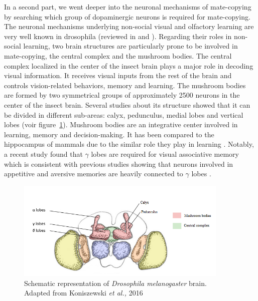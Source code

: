 \documentclass[a4paper, 12pt]{article}
\begin{document}
In a second part, we went deeper into the neuronal mechanisms of mate-copying by searching which group of dopaminergic neurons is required for mate-copying. The neuronal mechanisms underlying non-social visual and olfactory learning are very well known in drosophila (reviewed in \textcite{guo_vision_2017} and \textcite{cognigni_right_2018}). Regarding their roles in non-social learning, two brain structures are particularly prone to be involved in mate-copying, the central complex and the mushroom bodies. The central complex localized in the center of the insect brain plays a major role in decoding visual information. It receives visual inputs from the rest of the brain and controls vision-related behaviors, memory and learning. The mushroom bodies are formed by two symmetrical groups of approximately 2500 neurons in the center of the insect brain. Several studies about its structure showed that it can be divided in different sub-areas: calyx, pedunculus, medial lobes and vertical lobes \parencite{aso_neuronal_2014}(voir figure~\ref{fig:brain}). Mushroom bodies are an integrative center involved in learning, memory and decision-making. It has been compared to the hippocampus of mammals due to the similar role they play in learning \parencite{strausfeld_evolution_1998}.
Notably, a recent study found that \(\gamma\) lobes are required for visual associative memory \parencite{ vogt_shared_2014} which is consistent with previous studies showing that neurons involved in appetitive and aversive memories are heavily connected to \(\gamma\) lobes \parencite{claridge_writing_2009, burke_layered_2012}. 

	\begin{figure}
	\centering
	\includegraphics[width=0.9\textwidth]{images/brain}
	\caption{Schematic representation of \textit{Drosophila melanogaster} brain.\\
		Adapted from Koniszewski \textit{et al.,} 2016
		}
	\label{fig:brain}
\end{figure}
\end{document}
